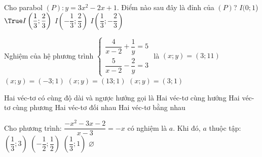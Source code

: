 \begin{ex}%
	Cho parabol $(P): y=3x^2-2x+1$. Điểm nào sau đây là đỉnh của $(P)$?
	\choice
	{$I(0;1$)}
	{$\True I\left(\dfrac{1}{3};\dfrac{2}{3}\right)$}
	{$I\left(-\dfrac{1}{3};\dfrac{2}{3}\right)$}
	{$I\left(\dfrac{1}{3};-\dfrac{2}{3}\right)$}
\end{ex}
\begin{ex}%
	Nghiệm của hệ phương trình $\begin{cases}
	\dfrac{4}{x-2}+\dfrac{1}{y}=5\\
	\dfrac{5}{x-2}-\dfrac{2}{y}=3
	\end{cases}$ là
	\choice
	{$(x;y)=(3;11)$}
	{$(x;y)=(-3;1)$}
	{$(x;y)=(13;1)$}
	{\True $(x;y)=(3;1)$}
\end{ex}
\begin{ex}%
	Hai véc-tơ có cùng độ dài và ngược hướng gọi là
	\choice
	{Hai véc-tơ cùng hướng}
	{Hai véc-tơ cùng phương}
	{\True Hai véc-tơ đối nhau}
	{Hai véc-tơ bằng nhau}
\end{ex}
\begin{ex}%
	Cho phương trình: $\dfrac{-x^2-3x-2}{x-3}=-x$ có nghiệm là $a$. Khi đó, $a$ thuộc tập:
	\choice
	{$\left(\dfrac{1}{3};3\right)$}
	{\True $\left(-\dfrac{1}{2};\dfrac{1}{2}\right)$}
	{$\left(\dfrac{1}{3};1\right)$}
	{$\varnothing$}
\end{ex}

